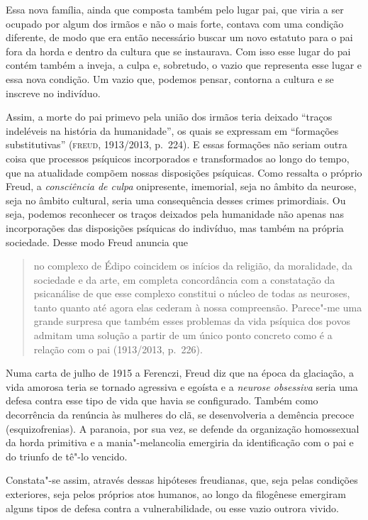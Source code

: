 Essa nova família, ainda que composta também pelo lugar pai, que viria a
ser ocupado por algum dos irmãos e não o mais forte, contava com uma
condição diferente, de modo que era então necessário buscar um novo
estatuto para o pai fora da horda e dentro da cultura que se instaurava.
Com isso esse lugar do pai contém também a inveja, a culpa e, sobretudo,
o vazio que representa esse lugar e essa nova condição. Um vazio que,
podemos pensar, contorna a cultura e se inscreve no indivíduo.

Assim, a morte do pai primevo pela união dos irmãos teria deixado
``traços indeléveis na história da humanidade'', os quais se expressam
em ``formações substitutivas'' (\textsc{freud}, 1913/2013, p.~224). E essas
formações não seriam outra coisa que processos psíquicos incorporados e
transformados ao longo do tempo, que na atualidade compõem nossas
disposições psíquicas. Como ressalta o próprio Freud, a
\emph{consciência de culpa} onipresente, imemorial, seja no âmbito da
neurose, seja no âmbito cultural, seria uma consequência desses crimes
primordiais. Ou seja, podemos reconhecer os traços deixados pela
humanidade não apenas nas incorporações das disposições psíquicas do
indivíduo, mas também na própria sociedade. Desse modo Freud anuncia
que

\begin{quote}
no complexo de Édipo coincidem os inícios da religião, da moralidade, da
sociedade e da arte, em completa concordância com a constatação da
psicanálise de que esse complexo constitui o núcleo de todas as
neuroses, tanto quanto até agora elas cederam à nossa compreensão.
Parece"-me uma grande surpresa que também esses problemas da vida
psíquica dos povos admitam uma solução a partir de um único ponto
concreto como é a relação com o pai (1913/2013, p.~226).
\end{quote}

Numa carta de julho de 1915 a Ferenczi, Freud diz que na época da
glaciação, a vida amorosa teria se tornado agressiva e egoísta e a
\emph{neurose obsessiva} seria uma defesa contra esse tipo de vida que
havia se configurado. Também como decorrência da renúncia às mulheres do
clã, se desenvolveria a demência precoce (esquizofrenias). A paranoia,
por sua vez, se defende da organização homossexual da horda primitiva e a
mania"-melancolia emergiria da identificação com o pai e do triunfo de
tê"-lo vencido.

Constata"-se assim, através dessas hipóteses freudianas, que, seja pelas
condições exteriores, seja pelos próprios atos humanos, ao longo da
filogênese emergiram alguns tipos de defesa contra a vulnerabilidade, ou
esse vazio outrora vivido.


